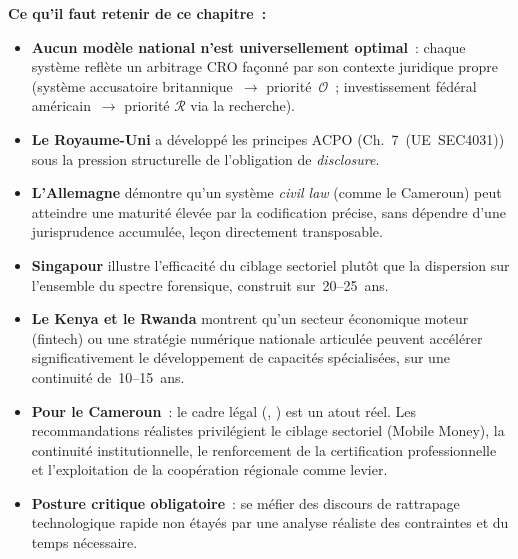 \separateur

\begin{boxresume}
\textbf{Ce qu'il faut retenir de ce chapitre~:}
\begin{itemize}
    \item \textbf{Aucun modèle national n'est universellement
          optimal}~: chaque système reflète un arbitrage CRO
          façonné par son contexte juridique propre (système
          accusatoire britannique~$\to$ priorité~$\mathcal{O}$~;
          investissement fédéral américain~$\to$ priorité
          $\mathcal{R}$ via la recherche).

    \item \textbf{Le Royaume-Uni} a développé les principes ACPO
          (Ch.~7~(UE~SEC4031)) sous la pression structurelle
          de l'obligation de \textit{disclosure}.

    \item \textbf{L'Allemagne} démontre qu'un système \textit{civil
          law} (comme le Cameroun) peut atteindre une maturité
          élevée par la codification précise, sans dépendre
          d'une jurisprudence accumulée, leçon directement
          transposable.

    \item \textbf{Singapour} illustre l'efficacité du ciblage
          sectoriel plutôt que la dispersion sur l'ensemble
          du spectre forensique, construit sur~20--25~ans.

    \item \textbf{Le Kenya et le Rwanda} montrent qu'un secteur
          économique moteur (fintech) ou une stratégie numérique
          nationale articulée peuvent accélérer significativement
          le développement de capacités spécialisées, sur une
          continuité de~10--15~ans.

    \item \textbf{Pour le Cameroun}~: le cadre légal
          (, ) est un atout réel.
          Les recommandations réalistes privilégient le ciblage
          sectoriel (Mobile Money), la continuité institutionnelle,
          le renforcement de la certification professionnelle et
          l'exploitation de la coopération régionale comme levier.

    \item \textbf{Posture critique obligatoire}~: se méfier des
          discours de rattrapage technologique rapide non étayés
          par une analyse réaliste des contraintes et du temps
          nécessaire.
\end{itemize}
\end{boxresume}

